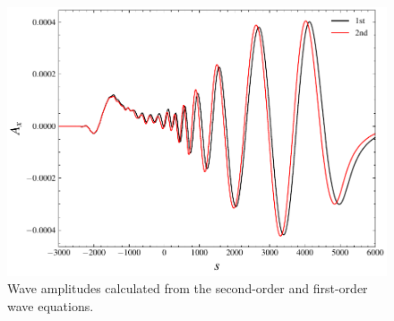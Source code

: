 
\begin{figure}[htbp]
    \centering
    \includegraphics[scale=0.5]{cpc_img/fig_diff.pdf}
    \caption{
Wave amplitudes calculated 
    from the second-order and first-order wave equations. 
    }
    \label{fig.cmp2}
\end{figure}